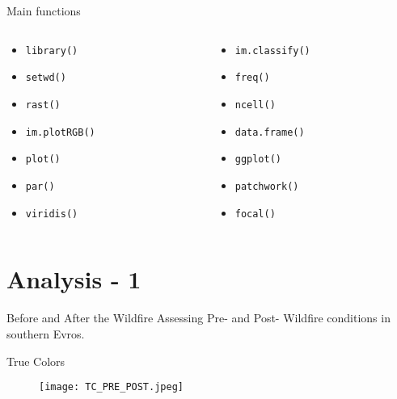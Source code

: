 \documentclass{beamer}
\begin{document}
\begin{frame}{Main functions}
\bigskip
\begin{columns}
    \begin{column}{0.5\textwidth}
    \begin{itemize}
        \item    \texttt{library()} 
        \item    \texttt{setwd()} 
        \item    \texttt{rast()} 
        \item    \texttt{im.plotRGB()}
        \item    \texttt{plot()}
        \item    \texttt{par()}
        \item    \texttt{viridis()}
    \end{itemize}
    \end{column}
    \begin{column}{0.5\textwidth}  
     \begin{itemize}
        \item    \texttt{im.classify()}
        \item    \texttt{freq()} 
        \item    \texttt{ncell()}
        \item    \texttt{data.frame()}
        \item    \texttt{ggplot()}
        \item    \texttt{patchwork()}
        \item    \texttt{focal()}
        \end{itemize}
    \end{column}
\end{columns}
\end{frame}

\section{Analysis - 1} 
\begin{frame}{Before and After the Wildfire}
\centering
Assessing Pre- and Post- Wildfire conditions in southern Evros. 

\bigskip

\centering True Colors

\begin{figure}
    \centering
    \texttt{[image: TC\_PRE\_POST.jpeg]}
\end{figure}
\end{frame}
\end{document}
